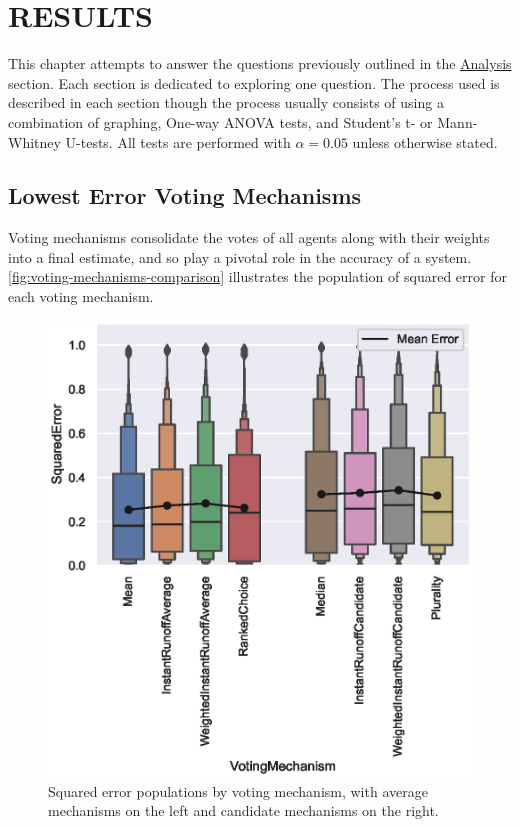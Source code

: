%
%

\chapter{RESULTS}\label{ch:results}
This chapter attempts to answer the questions previously outlined in the
\hyperref[subsec:analysis]{Analysis} section.
Each section is dedicated to exploring one question.
The process used is described in each section though the process usually
consists of using a combination of graphing, One-way ANOVA tests, and
Student's t- or Mann-Whitney U-tests.
All tests are performed with $\alpha = 0.05$ unless otherwise stated.

\section{Lowest Error Voting Mechanisms}\label{sec:lowest-error-voting-mechanism}
Voting mechanisms consolidate the votes of all agents along with their weights
into a final estimate, and so play a pivotal role in the accuracy of a system.
\autoref{fig:voting-mechanisms-comparison} illustrates the population of
squared error for each voting mechanism.

\begin{figure}[htbp]
    \centering
    \includegraphics[scale=0.75]
    {./content/figures/voting_mechanisms_comparison}
    \caption{Squared error populations by voting mechanism, with average
    mechanisms on the left and candidate mechanisms on the right.}
    \label{fig:voting-mechanisms-comparison}
\end{figure}

